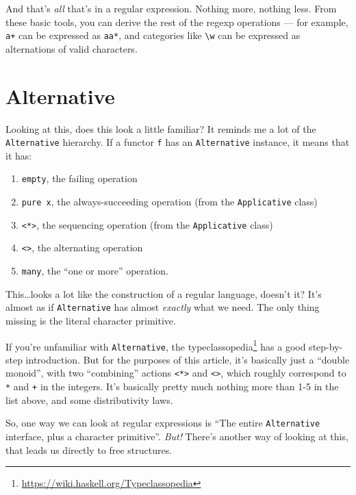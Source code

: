\documentclass[]{article}
\renewcommand{\href}[2]{#2\footnote{\url{#1}}}
\begin{document}
And that's \emph{all} that's in a regular expression. Nothing more, nothing
less. From these basic tools, you can derive the rest of the regexp operations
--- for example, \texttt{a+} can be expressed as \texttt{aa*}, and categories
like \texttt{\textbackslash{}w} can be expressed as alternations of valid
characters.

\hypertarget{alternative}{%
\section{Alternative}\label{alternative}}

Looking at this, does this look a little familiar? It reminds me a lot of the
\texttt{Alternative} hierarchy. If a functor \texttt{f} has an
\texttt{Alternative} instance, it means that it has:

\begin{enumerate}
\def\labelenumi{\arabic{enumi}.}
\tightlist
\item
  \texttt{empty}, the failing operation
\item
  \texttt{pure\ x}, the always-succeeding operation (from the
  \texttt{Applicative} class)
\item
  \texttt{\textless{}*\textgreater{}}, the sequencing operation (from the
  \texttt{Applicative} class)
\item
  \texttt{\textless{}\textbar{}\textgreater{}}, the alternating operation
\item
  \texttt{many}, the ``one or more'' operation.
\end{enumerate}

This\ldots{}looks a lot like the construction of a regular language, doesn't it?
It's almost as if \texttt{Alternative} has almost \emph{exactly} what we need.
The only thing missing is the literal character primitive.

If you're unfamiliar with \texttt{Alternative}, the
\href{https://wiki.haskell.org/Typeclassopedia}{typeclassopedia} has a good
step-by-step introduction. But for the purposes of this article, it's basically
just a ``double monoid'', with two ``combining'' actions
\texttt{\textless{}*\textgreater{}} and
\texttt{\textless{}\textbar{}\textgreater{}}, which roughly correspond to
\texttt{*} and \texttt{+} in the integers. It's basically pretty much nothing
more than 1-5 in the list above, and some distributivity laws.

So, one way we can look at regular expressions is ``The entire
\texttt{Alternative} interface, plus a character primitive''. \emph{But!}
There's another way of looking at this, that leads us directly to free
structures.
\end{document}
